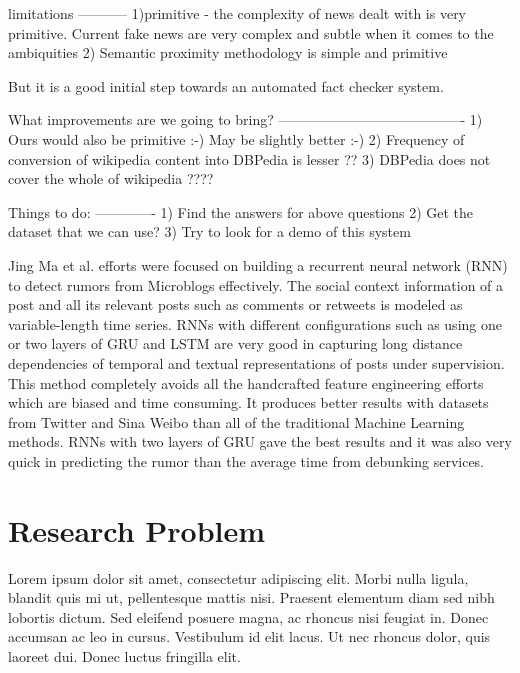 \documentclass[a4paper, 11pt]{article}
\begin{document}
limitations
-----------
1)primitive - the complexity of news dealt with is very primitive. Current fake news are very complex and subtle when it comes to the ambiquities
2) Semantic proximity methodology is simple and primitive


But it is a good initial step towards an automated fact checker system.


What improvements are we going to bring?
----------------------------------------
1) Ours would also be primitive :-) May be slightly better :-)
2) Frequency of conversion of wikipedia content into DBPedia is lesser ??
3) DBPedia does not cover the whole of wikipedia ???? 

Things to do:
-------------
1) Find the answers for above questions
2) Get the dataset that we can use?
3) Try to look for a demo of this system

Jing Ma et al. efforts were focused on building a recurrent neural network (RNN) to detect rumors from Microblogs effectively. The social context information of a post and all its relevant posts such as comments or retweets is modeled as variable-length time series.  RNNs with different configurations such as using one or two layers of GRU and LSTM are very good in capturing long distance dependencies of temporal and textual representations of posts under supervision. This method completely avoids all the handcrafted feature engineering efforts which are biased and time consuming. It produces better results with datasets from Twitter and Sina Weibo than all of the traditional Machine Learning methods. RNNs with two layers of GRU gave the best results and it was also very quick in predicting the rumor than the average time from debunking services.  

\section{Research Problem}
Lorem ipsum dolor sit amet, consectetur adipiscing elit. Morbi nulla ligula, blandit quis mi ut, pellentesque mattis nisi. Praesent elementum diam sed nibh lobortis dictum. Sed eleifend posuere magna, ac rhoncus nisi feugiat in. Donec accumsan ac leo in cursus. Vestibulum id elit lacus. Ut nec rhoncus dolor, quis laoreet dui. Donec luctus fringilla elit.
\end{document}

